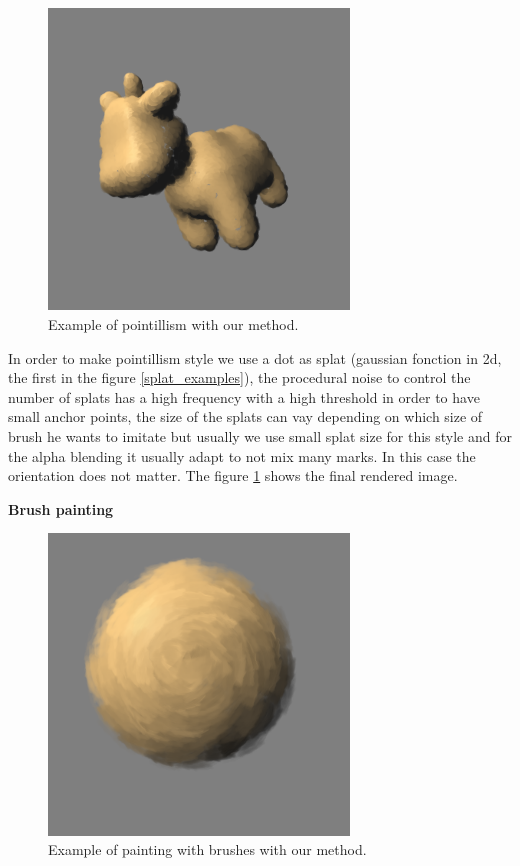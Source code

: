 \begin{figure}[H]
    \begin{center}
    \includegraphics[width=80mm, height=80mm]{Resultats/spotPoint/final.png}
    \end{center}
    \caption{Example of pointillism with our method.}
    \label{final_point}
\end{figure}

In order to make pointillism style we use a dot as splat (gaussian fonction in 2d, the first in the figure \ref{splat_examples}), the procedural noise to control the number of splats has a high frequency with a high threshold in order to have small anchor points, the size of the splats can vay depending on which size of brush he wants to imitate but usually we use small splat size for this style and for the alpha blending it usually adapt to not mix many marks. In this case the orientation does not matter. The figure \ref{final_point} shows the final rendered image. \newline

\textbf{Brush painting}

\begin{figure}[H]
    \begin{center}
    \includegraphics[width=80mm, height=80mm]{Resultats/painting1/final.png}
    \end{center}
    \caption{Example of painting with brushes with our method.}
    \label{final_brushes}
\end{figure}

